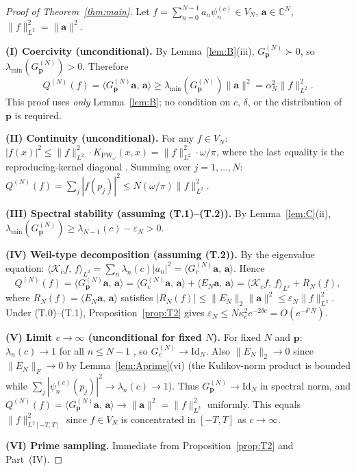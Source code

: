 \documentclass[12pt,a4paper]{amsart}
\theoremstyle{definition}
\newcommand{\PW}{\mathrm{PW}_\omega}
\newcommand{\Kop}{\mathcal{K}_c}
\newcommand{\Kul}{\kappa_c}
\newcommand{\GVM}{G^{(N)}_{\mathbf{p}}}
\newcommand{\AM}{\alpha_N}
\newcommand{\QM}{Q^{(N)}}
\newcommand{\psin}{\psi_n^{(c)}}
\newcommand{\EN}{E_N}
\newcommand{\norm}[1]{\|#1\|}
\newcommand{\ip}[2]{\langle #1,\, #2\rangle}
\begin{document}
\begin{proof}[Proof of Theorem~\ref{thm:main}]
Let $f=\sum_{n=0}^{N-1}a_n\psin\in V_N$,
$\mathbf{a}\in\mathbb{C}^N$, $\norm{f}_{L^2}^2=\norm{\mathbf{a}}^2$.

\medskip\noindent\textbf{(I) Coercivity (unconditional).}
By Lemma~\ref{lem:B}(iii), $\GVM\succ0$, so
$\lambda_{\min}(\GVM)>0$. Therefore
\[
  \QM(f)=\ip{\GVM\mathbf{a}}{\mathbf{a}}
  \geq\lambda_{\min}(\GVM)\norm{\mathbf{a}}^2
  =\AM^2\norm{f}_{L^2}^2.
\]
This proof uses \emph{only} Lemma~\ref{lem:B}; no condition
on $c$, $\delta$, or the distribution of $\mathbf{p}$ is required.

\medskip\noindent\textbf{(II) Continuity (unconditional).}
For any $f\in V_N$:
$|f(x)|^2\leq\norm{f}_{L^2}^2\cdot K_{\PW}(x,x)=\norm{f}_{L^2}^2\cdot
\omega/\pi$, where the last equality is the reproducing-kernel
diagonal \cite[Eq.~(3)]{BonamiKaroui}.
Summing over $j=1,\ldots,N$:
$\QM(f)=\sum_j|f(p_j)|^2\leq N(\omega/\pi)\norm{f}_{L^2}^2$.

\medskip\noindent\textbf{(III) Spectral stability (assuming (T.1)--(T.2)).}
By Lemma~\ref{lem:C}(ii),
$\lambda_{\min}(\GVM)\geq\lambda_{N-1}(c)-\varepsilon_N>0$.

\medskip\noindent\textbf{(IV) Weil-type decomposition (assuming (T.2)).}
By the eigenvalue equation:
$\ip{\Kop f}{f}_{L^2}=\sum_n\lambda_n(c)|a_n|^2
=\ip{G_c^{(N)}\mathbf{a}}{\mathbf{a}}$.
Hence
\[
  \QM(f)
  =\ip{\GVM\mathbf{a}}{\mathbf{a}}
  =\ip{G_c^{(N)}\mathbf{a}}{\mathbf{a}}+\ip{\EN\mathbf{a}}{\mathbf{a}}
  =\ip{\Kop f}{f}_{L^2}+R_N(f),
\]
where $R_N(f)=\ip{\EN\mathbf{a}}{\mathbf{a}}$ satisfies
$|R_N(f)|\leq\norm{\EN}_2\norm{\mathbf{a}}^2\leq\varepsilon_N\norm{f}_{L^2}^2$.
Under (T.0)--(T.1), Proposition~\ref{prop:T2} gives
$\varepsilon_N\leq N\Kul^2 e^{-2\delta c}=O(e^{-\delta'N})$.

\medskip\noindent\textbf{(V) Limit $c\to\infty$ (unconditional for fixed $N$).}
For fixed $N$ and $\mathbf{p}$: $\lambda_n(c)\to1$ for all
$n\leq N-1$ \cite{Slepian1978}, so $G_c^{(N)}\to\mathrm{Id}_N$.
Also $\norm{\EN}_2\to0$ since $\norm{\EN}_F\to0$ by
Lemma~\ref{lem:Aprime}(vi) (the Kulikov-norm product is bounded
while $\sum_j|\psin(p_j)|^2\to\lambda_n(c)\to1$).
Thus $\GVM\to\mathrm{Id}_N$ in spectral norm, and
$\QM(f)=\ip{\GVM\mathbf{a}}{\mathbf{a}}\to\norm{\mathbf{a}}^2
=\norm{f}_{L^2}^2$ uniformly.
This equals $\norm{f}_{L^2[-T,T]}^2$ since $f\in V_N$ is
concentrated in $[-T,T]$ as $c\to\infty$.

\medskip\noindent\textbf{(VI) Prime sampling.}
Immediate from Proposition~\ref{prop:T2} and Part~(IV).
\end{proof}
\end{document}
